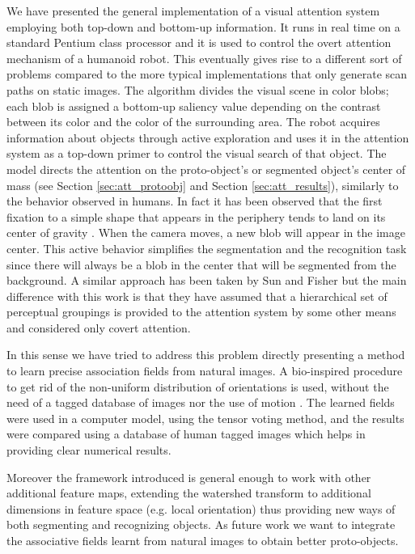 \documentclass{llncs}
\begin{document}
We have presented the general implementation of a visual
attention system employing both top-down and
bottom-up information. It runs in real time on a
standard Pentium class processor and it is used to
control the overt attention mechanism of a humanoid
robot. This eventually gives rise to a different sort of
problems compared to the more typical
implementations that only generate scan paths on static
images.
The algorithm divides the visual scene in color
blobs; each blob is assigned a bottom-up saliency value
depending on the contrast between its color and the
color of the surrounding area. The robot acquires
information about objects through active exploration
and uses it in the attention system as a top-down
primer to control the visual search of that object. The
model directs the attention on the proto-object's or
segmented object's center of mass (see Section \ref{sec:att_protoobj} and
Section \ref{sec:att_results}), similarly to the behavior observed in
humans. In fact it has been observed that the first
fixation to a simple shape that appears in the periphery
tends to land on its center of gravity \cite{MelcherK99}.
When the camera moves, a new blob will appear in
the image center. This active behavior simplifies the
segmentation and the recognition task since there will
always be a blob in the center that will be segmented
from the background.
A similar approach has been taken by Sun and
Fisher \cite{SunF03} but the main difference with this work is that
they have assumed that a hierarchical set of perceptual
groupings is provided to the attention system by some
other means and considered only covert attention.

In this sense we have tried to address this problem directly presenting a method to learn
precise association fields from natural images. A bio-inspired procedure
to get rid of the non-uniform distribution of orientations
is used, without the need of a tagged database of images \cite{ElderG02} nor
the use of motion \cite{Prodohl01}.
The learned fields were used in a computer model, using the tensor voting method,
and the results were compared using a database of human tagged images which helps
in providing clear numerical results.

Moreover the framework introduced is general enough
to work with other additional feature maps, extending the
watershed transform to additional dimensions in feature
space (e.g. local orientation) thus providing new ways
of both segmenting and recognizing objects.
As future work we want to integrate the associative fields
learnt from natural images to obtain better proto-objects.








\end{document}
